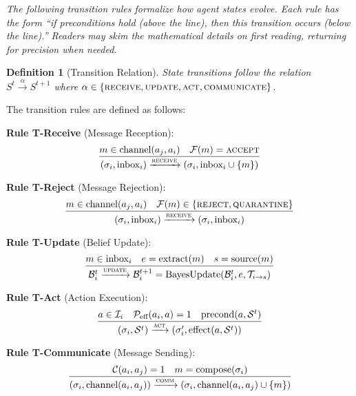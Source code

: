 \documentclass[
]{article}
\newtheorem{definition}{Definition}[section]
\begin{document}
\emph{The following transition rules formalize how agent states evolve.
Each rule has the form ``if preconditions hold (above the line), then
this transition occurs (below the line).'' Readers may skim the
mathematical details on first reading, returning for precision when
needed.}

\begin{definition}[Transition Relation]
\label{def:transition}
State transitions follow the relation $S^t \xrightarrow{\alpha} S^{t+1}$ where $\alpha \in \{\textsc{receive}, \textsc{update}, \textsc{act}, \textsc{communicate}\}$.
\end{definition}

The transition rules are defined as follows:

\textbf{Rule T-Receive} (Message Reception): \begin{equation}
\label{eq:rule-receive}
\frac{m \in \text{channel}(a_j, a_i) \quad \mathcal{F}(m) = \textsc{accept}}{(\sigma_i, \text{inbox}_i) \xrightarrow{\textsc{receive}} (\sigma_i, \text{inbox}_i \cup \{m\})}
\end{equation}

\textbf{Rule T-Reject} (Message Rejection): \begin{equation}
\label{eq:rule-reject}
\frac{m \in \text{channel}(a_j, a_i) \quad \mathcal{F}(m) \in \{\textsc{reject}, \textsc{quarantine}\}}{(\sigma_i, \text{inbox}_i) \xrightarrow{\textsc{receive}} (\sigma_i, \text{inbox}_i)}
\end{equation}

\textbf{Rule T-Update} (Belief Update): \begin{equation}
\label{eq:rule-update}
\frac{m \in \text{inbox}_i \quad e = \text{extract}(m) \quad s = \text{source}(m)}{\mathcal{B}_i^t \xrightarrow{\textsc{update}} \mathcal{B}_i^{t+1} = \text{BayesUpdate}(\mathcal{B}_i^t, e, \mathcal{T}_{i \to s})}
\end{equation}

\textbf{Rule T-Act} (Action Execution): \begin{equation}
\label{eq:rule-act}
\frac{a \in \mathcal{I}_i \quad \mathcal{P}_{\text{eff}}(a_i, a) = 1 \quad \text{precond}(a, \mathcal{S}^t)}{(\sigma_i, \mathcal{S}^t) \xrightarrow{\textsc{act}} (\sigma_i', \text{effect}(a, \mathcal{S}^t))}
\end{equation}

\textbf{Rule T-Communicate} (Message Sending): \begin{equation}
\label{eq:rule-comm}
\frac{\mathcal{C}(a_i, a_j) = 1 \quad m = \text{compose}(\sigma_i)}{(\sigma_i, \text{channel}(a_i, a_j)) \xrightarrow{\textsc{comm}} (\sigma_i, \text{channel}(a_i, a_j) \cup \{m\})}
\end{equation}
\end{document}
